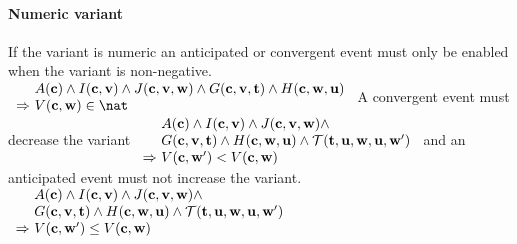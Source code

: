 \paragraph{Numeric variant}
\label{numeric_variant}
  If the variant is numeric an anticipated or convergent event
  must only be enabled when the variant is non-negative.
%
  {$\begin{array}{r@{\ }l}
      & \axioms \land \absinvariants \land \concinvariants \land
      \absguards \land \concguards \\
      \limp & V(\allconstants,\concvariables)\in\nat
    \end{array}$}
A convergent event must decrease the variant
%
  {$\begin{array}{r@{\ }l}
      & \axioms \land \absinvariants \land \concinvariants \land \\
      & \absguards \land \concguards \land \bapred \\
      \limp & V(\allconstants,\concvariables')<V(\allconstants,\concvariables)
    \end{array}$}
and an anticipated event must not increase the variant.
%
  {$\begin{array}{r@{\ }l}
      & \axioms \land \absinvariants \land \concinvariants \land \\
      & \absguards \land \concguards \land \bapred \\
      \limp & V(\allconstants,\concvariables')\leq V(\allconstants,\concvariables)
    \end{array}$}

